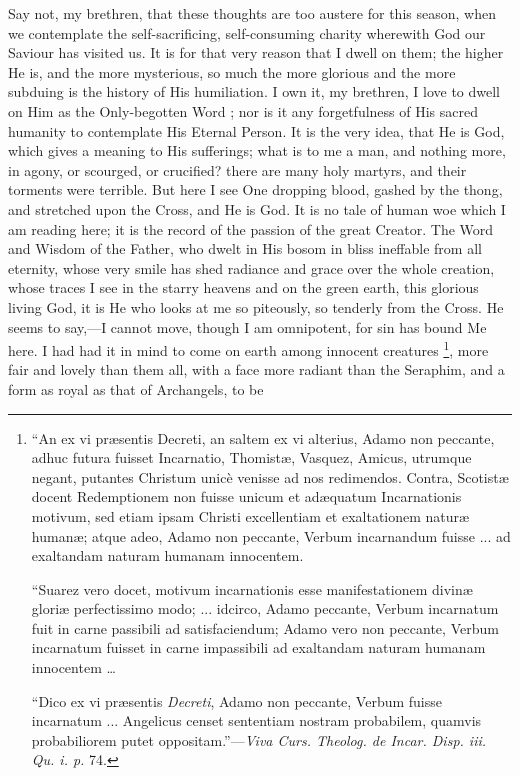Say not, my brethren, that these thoughts are too austere for this
season, when we contemplate the self-sacrificing, self-consuming
charity wherewith God our Saviour has visited us. It is for that very
reason that I dwell on them; the higher He is, and the more
mysterious, so much the more glorious and the more subduing is the
history of His humiliation. I own it, my brethren, I love to dwell on
Him as the Only-begotten Word ; nor is it any forgetfulness of His
sacred humanity to contemplate His Eternal Person. It is the very
idea, that He is God, which gives a meaning to His sufferings; what is
to me a man, and nothing more, in agony, or scourged, or crucified?
there are many holy martyrs, and their torments were terrible. But
here I see One dropping blood, gashed by the thong, and stretched upon
the Cross, and He is God. It is no tale of human woe which I am
reading here; it is the record of the passion of the great Creator.
The Word and Wisdom of the Father, who dwelt in His bosom in bliss
ineffable from all eternity, whose very smile has shed radiance and
grace over the whole creation, whose traces I see in the starry
heavens and on the green earth, this glorious living God, it is He who
looks at me so piteously, so tenderly from the Cross. He seems to say,—I
cannot move, though I am omnipotent, for sin has bound Me here. I had
had it in mind to come on earth among innocent creatures \footnote{``An ex vi præsentis Decreti, an saltem ex vi
alterius, Adamo non peccante, adhuc futura fuisset Incarnatio,
Thomistæ, Vasquez, Amicus, utrumque negant, putantes Christum unicè
venisse ad nos redimendos. Contra, Scotistæ docent Redemptionem non
fuisse unicum et adæquatum Incarnationis motivum, sed etiam ipsam
Christi excellentiam et exaltationem naturæ humanæ; atque adeo,
Adamo non peccante, Verbum incarnandum fuisse ... ad exaltandam
naturam humanam innocentem.

``Suarez vero docet, motivum incarnationis esse manifestationem
divinæ gloriæ perfectissimo modo; ... idcirco, Adamo peccante,
Verbum incarnatum fuit in carne passibili ad satisfaciendum; Adamo
vero non peccante, Verbum incarnatum fuisset in carne impassibili ad
exaltandam naturam humanam innocentem …

``Dico ex vi præsentis \emph{Decreti}, Adamo non peccante,
Verbum fuisse incarnatum ... Angelicus censet sententiam nostram
probabilem, quamvis probabiliorem putet oppositam.''—\emph{Viva
Curs. Theolog. de Incar. Disp. iii. Qu. i. p.} 74.}, more fair and lovely than them all, with a face more radiant
than the Seraphim, and a form as royal as that of Archangels, to be
